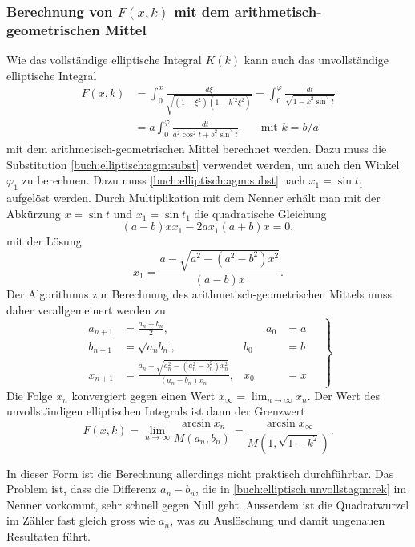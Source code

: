 %
%
\subsubsection{Berechnung von $F(x,k)$ mit dem arithmetisch-geometrischen Mittel\label{buch:elliptisch:subsubection:berechnung-fxk-agm}}
Wie das vollständige elliptische Integral $K(k)$ kann auch das  
unvollständige elliptische Integral
\begin{align*}
F(x,k)
&=
\int_0^x \frac{d\xi}{\sqrt{(1-\xi^2)(1-k^{\prime 2}\xi^2)}}
=
\int_0^{\varphi}
\frac{dt}{\sqrt{1-k^2 \sin^2 t}}
\\
&=
a
\int_0^{\varphi} \frac{dt}{a^2 \cos^2 t + b^2 \sin^2 t}
\qquad\text{mit $k=b/a$}
\end{align*}
mit dem arithmetisch-geometrischen Mittel berechnet werden.
Dazu muss die Substitution
\eqref{buch:elliptisch:agm:subst}
verwendet werden, um auch den Winkel $\varphi_1$ zu berechnen.
Dazu muss \eqref{buch:elliptisch:agm:subst} nach $x_1=\sin t_1$ 
aufgelöst werden.
Durch Multiplikation mit dem Nenner erhält man mit der Abkürzung
$x=\sin t$ und $x_1=\sin t_1$  die quadratische Gleichung
\[
(a-b)x x_1
-
2ax_1
(a+b)x 
=
0,
\]
mit der Lösung
\begin{equation}
x_1 
=
\frac{a-\sqrt{a^2-(a^2-b^2)x^2}}{(a-b)x}.
\label{buch:elliptisch:unvollstagm:xrek}
\end{equation}
Der Algorithmus zur Berechnung des arithmetisch-geometrischen Mittels
muss daher verallgemeinert werden zu
\begin{equation}
\left.
\begin{aligned}
a_{n+1} &= \frac{a_n+b_n}2,  &\qquad a_0 &= a
\\
b_{n+1} &= \sqrt{a_nb_n},    & b_0 &= b
\\
x_{n+1} &= \frac{a_n-\sqrt{a_n^2-(a_n^2-b_n^2)x_n^2}}{(a_n-b_n)x_n}, & x_0 &= x
\end{aligned}
\quad
\right\}
\label{buch:elliptisch:unvollstagm:rek}
\end{equation}
Die Folge $x_n$ konvergiert gegen einen Wert $x_{\infty} = \lim_{n\to\infty} x_n$.
Der Wert des unvollständigen elliptischen Integrals ist dann der Grenzwert
\[
F(x,k)
=
\lim_{n\to\infty}
\frac{\arcsin x_n}{M(a_n,b_n)}
=
\frac{\arcsin x_{\infty}}{M(1,\sqrt{1-k^2})}.
\]

In dieser Form ist die Berechnung allerdings nicht praktisch durchführbar.
Das Problem ist, dass die Differenz $a_n-b_n$, die in 
\eqref{buch:elliptisch:unvollstagm:rek}
im Nenner vorkommt, sehr schnell gegen Null geht.
Ausserdem ist die Quadratwurzel im Zähler fast gleich gross wie
$a_n$, was zu Auslöschung und damit ungenauen Resultaten führt.
\label{buch:elliptisch:agm:ellintegral-stabilitaet}

